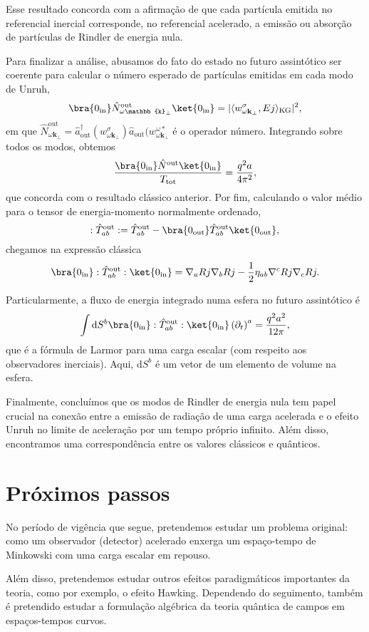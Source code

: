 \documentclass[12pt]{article}
\newcommand{\dd}{\mathrm{d}}
\newcommand{\innerkg}[2]{\langle#1,#2\rangle_{\text{KG}}}
\newcommand{\Ttot}{T_{\text{tot}}}
\newcommand{\wsig}[1]{w^{\sigma}_{#1\mathbf{k}_\perp}}
\begin{document}
Esse resultado concorda com a afirmação de que cada partícula emitida no referencial inercial corresponde, no referencial acelerado, a emissão ou absorção de partículas de Rindler de energia nula.

Para finalizar a análise, abusamos do fato do estado no futuro assintótico ser coerente para calcular o número esperado de partículas emitidas em cada modo de Unruh,
\begin{equation}
    \bra{0_{\text{in}}}\hat{N}^{\text{out}}_{\omega\mathbb{k}_\perp}\ket{0_\text{in}}=\lvert\innerkg{\wsig{\omega}}{Ej}\rvert^2,
\end{equation}
em que \(\hat{N}^{\text{out}}_{\omega\mathbf{k}_\perp}=\hat{a}^{\dagger}_{\text{out}}(\wsig{\omega})\hat{a}_{\text{out}}(w^{\omega*}_{\omega\mathbf{k}_\perp}\) é o operador número. Integrando sobre todos os modos, obtemos
\begin{equation}
    \frac{\bra{0_{\text{in}}}\hat{N}^{\text{out}}\ket{0_\text{in}}}{\Ttot}=\frac{q^2a}{4\pi^2},
\end{equation}
que concorda com o resultado clássico anterior. Por fim, calculando o valor médio para o tensor de energia-momento normalmente ordenado,
\begin{equation}
    :\hat{T}^{\text{out}}_{ab}:=\hat{T}^{\text{out}}_{ab}-\bra{0_\text{out}}\hat{T}^{\text{out}}_{ab}\ket{0_{\text{out}}},
\end{equation}
chegamos na expressão clássica
\begin{equation}
    \bra{0_{\text{in}}}:\hat{T}^{\text{out}}_{ab}:\ket{0_\text{in}}=\nabla_aRj\nabla_bRj-\frac{1}{2}\eta_{ab}\nabla^cRj\nabla_cRj.
\end{equation}

Particularmente, a fluxo de energia integrado numa esfera no futuro assintótico é
\begin{equation}
    \int\dd S^b \bra{0_{\text{in}}}:\hat{T}^{\text{out}}_{ab}:\ket{0_\text{in}}\left(\partial_t\right)^a=\frac{q^2a^2}{12\pi},
\end{equation}
que é a fórmula de Larmor para uma carga escalar (com respeito aos observadores inerciais)\cite{ren}. Aqui, \(\dd S^b\) é um vetor de um elemento de volume na esfera.

Finalmente, concluímos que os modos de Rindler de energia nula tem papel crucial na conexão entre a emissão de radiação de uma carga acelerada e o efeito Unruh no limite de aceleração por um tempo próprio infinito. Além disso, encontramos uma correspondência entre os valores clássicos e quânticos.

\section{Próximos passos}
No período de vigência que segue, pretendemos estudar um problema original: como um observador (detector) acelerado enxerga um espaço-tempo de Minkowski com uma carga escalar em repouso. 

Além disso, pretendemos estudar outros efeitos paradigmáticos importantes da teoria, como por exemplo, o efeito Hawking. Dependendo do seguimento, também é pretendido estudar a formulação algébrica da teoria quântica de campos em espaços-tempos curvos.



\nocite{*}
\end{document}
